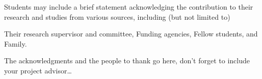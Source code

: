 
\begin{acknowledgements}
\addchaptertocentry{\acknowledgementname} %

Students may include a brief statement acknowledging the contribution to their research and studies from various sources, including (but not limited  to)

Their research supervisor and committee,
Funding agencies,
Fellow students, and
Family.

The acknowledgments and the people to thank go here, don't forget to include your project advisor\ldots

\end{acknowledgements}